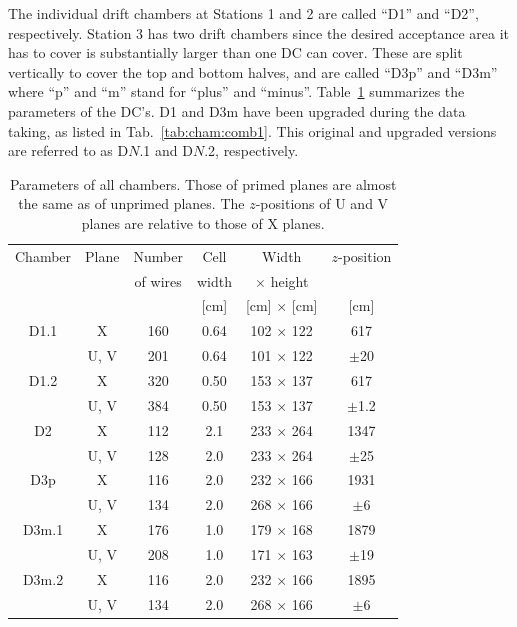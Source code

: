 The individual drift chambers at Stations 1 and 2 are called ``D1'' and ``D2'', respectively. Station 3 has two drift chambers since the desired acceptance area it has to cover is substantially larger than one DC can cover. These are split vertically to cover the top and bottom halves, and are called ``D3p'' and ``D3m'' where ``p'' and ``m'' stand for ``plus'' and ``minus''. Table~\ref{table:cham:param} summarizes the parameters of the DC's. D1 and D3m have been upgraded during the data taking, as listed in Tab.~\ref{tab:cham:comb1}. This original and upgraded versions are referred to as D$N$.1 and D$N$.2, respectively.

\begin{table}[bthp]\centering
	\begin{tabular}{cc|cccc}
		\hline \hline
		Chamber & Plane & Number   & Cell  & Width            & $z$-position \\
		&       & of wires & width & $\times$ height  &      \\ 
		&       &          & [cm]  & [cm] $\times$ [cm] & [cm] \\ 
		\hline
		D1.1    & X     & 160      & 0.64  & 102 $\times$ 122 &  617    \\
		& U, V  & 201      & 0.64  & 101 $\times$ 122 & $\pm$20 \\
		D1.2    & X     & 320      & 0.50  & 153 $\times$ 137 &  617    \\
		& U, V  & 384      & 0.50  & 153 $\times$ 137 & $\pm$1.2 \\
		D2      & X     & 112      & 2.1   & 233 $\times$ 264 & 1347    \\
		& U, V  & 128      & 2.0   & 233 $\times$ 264 & $\pm$25 \\
		D3p     & X     & 116      & 2.0   & 232 $\times$ 166 & 1931    \\
		& U, V  & 134      & 2.0   & 268 $\times$ 166 & $\pm$6  \\
		D3m.1   & X     & 176      & 1.0   & 179 $\times$ 168 & 1879    \\
		& U, V  & 208      & 1.0   & 171 $\times$ 163 & $\pm$19 \\
		D3m.2   & X     & 116      & 2.0   & 232 $\times$ 166 & 1895    \\
		& U, V  & 134      & 2.0   & 268 $\times$ 166 & $\pm$6  \\
		\hline
		\hline
	\end{tabular}
	\caption{Parameters of all chambers.
		Those of primed planes are almost the same as of unprimed planes.
		The $z$-positions of U and V planes are relative to those of X planes.
	}
	\label{table:cham:param}
\end{table}

